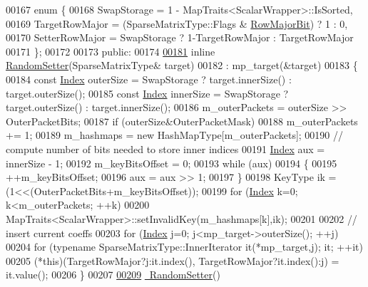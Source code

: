 \begin{DoxyCode}
00167     \textcolor{keyword}{enum} \{
00168       SwapStorage = 1 - MapTraits<ScalarWrapper>::IsSorted,
00169       TargetRowMajor = (SparseMatrixType::Flags & \hyperlink{group__flags_gae4f56c2a60bbe4bd2e44c5b19cbe8762}{RowMajorBit}) ? 1 : 0,
00170       SetterRowMajor = SwapStorage ? 1-TargetRowMajor : TargetRowMajor
00171     \};
00172 
00173   \textcolor{keyword}{public}:
00174 
\hyperlink{class_eigen_1_1_random_setter_a62e960bd52cec62a59ebb285f381138f}{00181}     \textcolor{keyword}{inline} \hyperlink{class_eigen_1_1_random_setter_a62e960bd52cec62a59ebb285f381138f}{RandomSetter}(SparseMatrixType& target)
00182       : mp\_target(&target)
00183     \{
00184       \textcolor{keyword}{const} \hyperlink{namespace_eigen_a62e77e0933482dafde8fe197d9a2cfde}{Index} outerSize = SwapStorage ? target.innerSize() : target.outerSize();
00185       \textcolor{keyword}{const} \hyperlink{namespace_eigen_a62e77e0933482dafde8fe197d9a2cfde}{Index} innerSize = SwapStorage ? target.outerSize() : target.innerSize();
00186       m\_outerPackets = outerSize >> OuterPacketBits;
00187       \textcolor{keywordflow}{if} (outerSize&OuterPacketMask)
00188         m\_outerPackets += 1;
00189       m\_hashmaps = \textcolor{keyword}{new} HashMapType[m\_outerPackets];
00190       \textcolor{comment}{// compute number of bits needed to store inner indices}
00191       \hyperlink{namespace_eigen_a62e77e0933482dafde8fe197d9a2cfde}{Index} aux = innerSize - 1;
00192       m\_keyBitsOffset = 0;
00193       \textcolor{keywordflow}{while} (aux)
00194       \{
00195         ++m\_keyBitsOffset;
00196         aux = aux >> 1;
00197       \}
00198       KeyType ik = (1<<(OuterPacketBits+m\_keyBitsOffset));
00199       \textcolor{keywordflow}{for} (\hyperlink{namespace_eigen_a62e77e0933482dafde8fe197d9a2cfde}{Index} k=0; k<m\_outerPackets; ++k)
00200         MapTraits<ScalarWrapper>::setInvalidKey(m\_hashmaps[k],ik);
00201 
00202       \textcolor{comment}{// insert current coeffs}
00203       \textcolor{keywordflow}{for} (\hyperlink{namespace_eigen_a62e77e0933482dafde8fe197d9a2cfde}{Index} j=0; j<mp\_target->outerSize(); ++j)
00204         \textcolor{keywordflow}{for} (\textcolor{keyword}{typename} SparseMatrixType::InnerIterator it(*mp\_target,j); it; ++it)
00205           (*\textcolor{keyword}{this})(TargetRowMajor?j:it.index(), TargetRowMajor?it.index():j) = it.value();
00206     \}
00207 
\hyperlink{class_eigen_1_1_random_setter_a3e4a78672df59ab4dd2799919b431027}{00209}     \hyperlink{class_eigen_1_1_random_setter_a3e4a78672df59ab4dd2799919b431027}{~RandomSetter}()

\end{DoxyCode}
